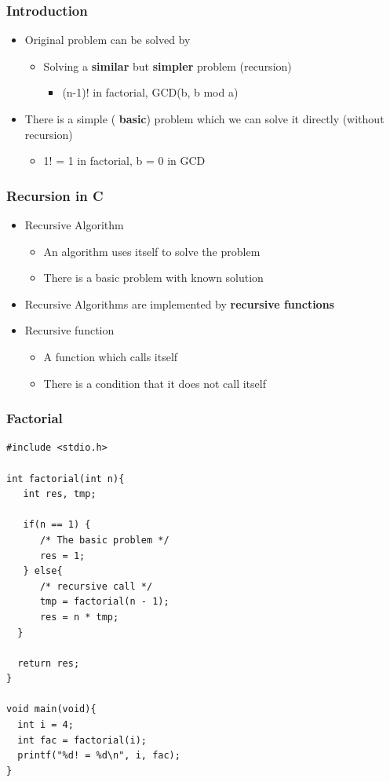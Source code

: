 \documentclass{../c-lecture}
\begin{document}
\begin{frame}
  \frametitle{Introduction}
  \begin{itemize}
    \item Original problem can be solved by
    \begin{itemize}
      \item
        Solving a \textbf{\color{Orange} similar} but
        \textbf{\color{LimeGreen} simpler} problem (recursion)
      \begin{itemize}
        \item (n-1)! in factorial, GCD(b, b mod a)
      \end{itemize}
    \end{itemize}
    \item
      There is a simple (\textbf{\color{RubineRed} basic}) problem which we can
      solve it directly (without recursion)
    \begin{itemize}
      \item 1! = 1 in factorial, b = 0 in GCD
    \end{itemize}
  \end{itemize}
\end{frame}

\begin{frame}
  \frametitle{Recursion in C}
  \begin{itemize}
    \item Recursive Algorithm
    \begin{itemize}
      \item An algorithm uses itself to solve the problem
      \item There is a basic problem with known solution
    \end{itemize}
    \item
      Recursive Algorithms are implemented by
      \textbf{\color{Orange} recursive functions}
    \item Recursive function
    \begin{itemize}
      \item A function which calls itself
      \item There is a condition that it does not call itself
    \end{itemize}
  \end{itemize}
\end{frame}

\begin{frame}[fragile]
  \frametitle{Factorial}
  \scriptsize
  \begin{verbatim}
#include <stdio.h>

int factorial(int n){
   int res, tmp;

   if(n == 1) {
      /* The basic problem */
      res = 1;
   } else{
      /* recursive call */
      tmp = factorial(n - 1);
      res = n * tmp;
  }

  return res;
}

void main(void){
  int i = 4;
  int fac = factorial(i);
  printf("%d! = %d\n", i, fac);
}
  \end{verbatim}
\end{frame}
\end{document}
